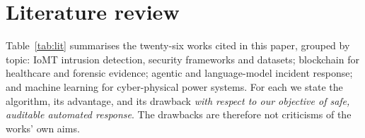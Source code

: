 \documentclass[preprint,12pt]{elsarticle}
\begin{document}
\section{Literature review}
\label{sec:lit}

Table~\ref{tab:lit} summarises the twenty-six works cited in this paper, grouped by topic: IoMT intrusion detection, security frameworks and datasets; blockchain for healthcare and forensic evidence; agentic and language-model incident response; and machine learning for cyber-physical power systems. For each we state the algorithm, its advantage, and its drawback \emph{with respect to our objective of safe, auditable automated response}. The drawbacks are therefore not criticisms of the works' own aims.
\end{document}
